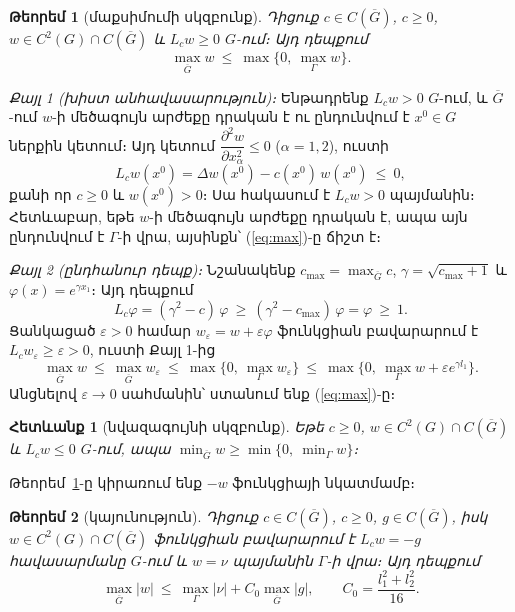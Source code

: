 \documentclass[12pt,a4paper]{article}
\makeatletter
\theoremstyle{arm}
\newtheorem{theorem}{Թեորեմ}
\newtheorem{corollary}{Հետևանք}
\theoremstyle{armdef}
\renewcommand{\proofname}{Ապացույց։}
\renewenvironment{proof}[1][\proofname]{\par\pushQED{\qed}\normalfont\topsep6\p@\@plus6\p@\relax
  \trivlist\item[\hskip\labelsep\bfseries #1]\ignorespaces}{\popQED\endtrivlist\@endpefalse}
\numberwithin{equation}{section}
\newcommand{\G}{\overline{G}}
\makeatother
\begin{document}
\begin{theorem}[մաքսիմումի սկզբունք]\label{thm:max}
Դիցուք $c\in C(\G)$, $c\ge0$, $w\in C^2(G)\cap C(\G)$ և $L_cw\ge0$ $G$-ում։ Այդ դեպքում
\begin{equation}\label{eq:max}
\max_{\G}w\ \le\ \max\Big\{0,\ \max_{\Gamma}w\Big\}.
\end{equation}
\end{theorem}

\begin{proof}
\emph{Քայլ 1 (խիստ անհավասարություն)։} Ենթադրենք $L_cw>0$ $G$-ում, և $\G$-ում $w$-ի մեծագույն արժեքը դրական է ու ընդունվում է $x^0\in G$ ներքին կետում։ Այդ կետում $\dfrac{\partial^2w}{\partial x_\alpha^2}\le0$ ($\alpha=1,2$), ուստի
\[L_cw(x^0)=\Delta w(x^0)-c(x^0)\,w(x^0)\ \le\ 0,\]
քանի որ $c\ge0$ և $w(x^0)>0$։ Սա հակասում է $L_cw>0$ պայմանին։ Հետևաբար, եթե $w$-ի մեծագույն արժեքը դրական է, ապա այն ընդունվում է $\Gamma$-ի վրա, այսինքն՝ (\ref{eq:max})-ը ճիշտ է։

\emph{Քայլ 2 (ընդհանուր դեպք)։} Նշանակենք $c_{\max}=\max_{\G}c$, $\gamma=\sqrt{c_{\max}+1}$ և $\varphi(x)=e^{\gamma x_1}$։ Այդ դեպքում
\[L_c\varphi=(\gamma^2-c)\,\varphi\ \ge\ (\gamma^2-c_{\max})\,\varphi=\varphi\ \ge\ 1.\]
Ցանկացած $\varepsilon>0$ համար $w_\varepsilon=w+\varepsilon\varphi$ ֆունկցիան բավարարում է $L_cw_\varepsilon\ge\varepsilon>0$, ուստի Քայլ 1-ից
\[\max_{\G}w\ \le\ \max_{\G}w_\varepsilon\ \le\ \max\Big\{0,\ \max_{\Gamma}w_\varepsilon\Big\}\ \le\ \max\Big\{0,\ \max_{\Gamma}w+\varepsilon e^{\gamma l_1}\Big\}.\]
Անցնելով $\varepsilon\to0$ սահմանին՝ ստանում ենք (\ref{eq:max})-ը։
\end{proof}

\begin{corollary}[նվազագույնի սկզբունք]\label{cor:min}
Եթե $c\ge0$, $w\in C^2(G)\cap C(\G)$ և $L_cw\le0$ $G$-ում, ապա $\min_{\G}w\ge\min\{0,\ \min_{\Gamma}w\}$։
\end{corollary}

\begin{proof}
Թեորեմ~\ref{thm:max}-ը կիրառում ենք $-w$ ֆունկցիայի նկատմամբ։
\end{proof}

\begin{theorem}[կայունություն]\label{thm:stab1}
Դիցուք $c\in C(\G)$, $c\ge0$, $g\in C(\G)$, իսկ $w\in C^2(G)\cap C(\G)$ ֆունկցիան բավարարում է $L_cw=-g$ հավասարմանը $G$-ում և $w=\nu$ պայմանին $\Gamma$-ի վրա։ Այդ դեպքում
\begin{equation}\label{eq:stab1}
\max_{\G}|w|\ \le\ \max_{\Gamma}|\nu|+C_0\max_{\G}|g|,\qquad C_0=\frac{l_1^2+l_2^2}{16}.
\end{equation}
\end{theorem}
\end{document}
